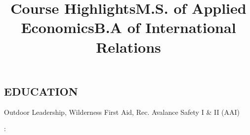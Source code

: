 \documentclass[resmargin, centered, 10pt]{../res}
\begin{document}
\begin{resume}
\section{EDUCATION}

\title{Course Highlights}
\employer{}
\dates{}
\location{}
\begin{position}
Outdoor Leadership, Wilderness First Aid, Rec. Avalance Safety I \& II (AAI)
\end{position}

\title{M.S. of Applied Economics}
\begin{position}
	: 
\end{position}

\title{B.A of International Relations}
\begin{position}
\end{position}

\end{resume}
\end{document}
